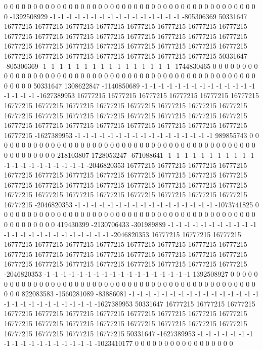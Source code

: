 0 0 0 0 0 0 0 0 0 0 0 0 0 0 0 0 0 0 0 0 0 0 0 0 0 0 0 0 0 0 0 0 0 0 0 0 0 0 0 0 0 0 0 0 -1392508929 -1 -1 -1 -1 -1 -1 -1 -1 -1 -1 -1 -1 -1 -1 -1 -1 -805306369 50331647 16777215 16777215 16777215 16777215 16777215 16777215 16777215 16777215 16777215 16777215 16777215 16777215 16777215 16777215 16777215 16777215 16777215 16777215 16777215 16777215 16777215 16777215 16777215 16777215 16777215 16777215 16777215 16777215 16777215 16777215 16777215 50331647 -805306369 -1 -1 -1 -1 -1 -1 -1 -1 -1 -1 -1 -1 -1 -1 -1 -1 -1744830465 0 0 0 0 0 0 0 0 0 0 0 0 0 0 0
0 0 0 0 0 0 0 0 0 0 0 0 0 0 0 0 0 0 0 0 0 0 0 0 0 0 0 0 0 0 0 0 0 0 0 0 0 0 0 0 0 50331647 1308622847 -1140850689 -1 -1 -1 -1 -1 -1 -1 -1 -1 -1 -1 -1 -1 -1 -1 -1 -1 -1 -1627389953 16777215 16777215 16777215 16777215 16777215 16777215 16777215 16777215 16777215 16777215 16777215 16777215 16777215 16777215 16777215 16777215 16777215 16777215 16777215 16777215 16777215 16777215 16777215 16777215 16777215 16777215 16777215 16777215 16777215 16777215 16777215 -1627389953 -1 -1 -1 -1 -1 -1 -1 -1 -1 -1 -1 -1 -1 -1 -1 -1 -1 989855743 0 0 0 0 0 0 0 0 0 0 0 0 0 0 0
0 0 0 0 0 0 0 0 0 0 0 0 0 0 0 0 0 0 0 0 0 0 0 0 0 0 0 0 0 0 0 0 0 0 0 0 0 0 0 218103807 1728053247 -671088641 -1 -1 -1 -1 -1 -1 -1 -1 -1 -1 -1 -1 -1 -1 -1 -1 -1 -1 -1 -1 -1 -2046820353 16777215 16777215 16777215 16777215 16777215 16777215 16777215 16777215 16777215 16777215 16777215 16777215 16777215 16777215 16777215 16777215 16777215 16777215 16777215 16777215 16777215 16777215 16777215 16777215 16777215 16777215 16777215 16777215 16777215 -2046820353 -1 -1 -1 -1 -1 -1 -1 -1 -1 -1 -1 -1 -1 -1 -1 -1 -1 -1073741825 0 0 0 0 0 0 0 0 0 0 0 0 0 0 0 0
0 0 0 0 0 0 0 0 0 0 0 0 0 0 0 0 0 0 0 0 0 0 0 0 0 0 0 0 0 0 0 0 0 0 0 0 0 419430399 -2130706433 -301989889 -1 -1 -1 -1 -1 -1 -1 -1 -1 -1 -1 -1 -1 -1 -1 -1 -1 -1 -1 -1 -1 -1 -1 -1 -2046820353 16777215 16777215 16777215 16777215 16777215 16777215 16777215 16777215 16777215 16777215 16777215 16777215 16777215 16777215 16777215 16777215 16777215 16777215 16777215 16777215 16777215 16777215 16777215 16777215 16777215 16777215 16777215 -2046820353 -1 -1 -1 -1 -1 -1 -1 -1 -1 -1 -1 -1 -1 -1 -1 -1 -1 -1 1392508927 0 0 0 0 0 0 0 0 0 0 0 0 0 0 0 0
0 0 0 0 0 0 0 0 0 0 0 0 0 0 0 0 0 0 0 0 0 0 0 0 0 0 0 0 0 0 0 0 0 0 0 822083583 -1560281089 -83886081 -1 -1 -1 -1 -1 -1 -1 -1 -1 -1 -1 -1 -1 -1 -1 -1 -1 -1 -1 -1 -1 -1 -1 -1 -1 -1 -1 -1627389953 50331647 16777215 16777215 16777215 16777215 16777215 16777215 16777215 16777215 16777215 16777215 16777215 16777215 16777215 16777215 16777215 16777215 16777215 16777215 16777215 16777215 16777215 16777215 16777215 50331647 -1627389953 -1 -1 -1 -1 -1 -1 -1 -1 -1 -1 -1 -1 -1 -1 -1 -1 -1 -1 -1023410177 0 0 0 0 0 0 0 0 0 0 0 0 0 0 0 0 0
